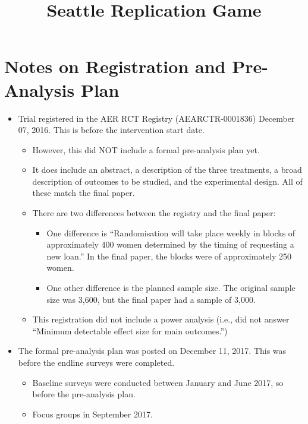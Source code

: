 \documentclass[]{article}
\title{Seattle Replication Game}
\author{}
\begin{document}
\maketitle



\section{Notes on Registration and Pre-Analysis Plan}

\begin{itemize}
	\item Trial registered in the AER RCT Registry (AEARCTR-0001836) December 07, 2016. This is before the intervention start date.
	\begin{itemize}
		\item However, this did NOT include a formal pre-analysis plan yet.
		\item It does include an abstract, a description of the three treatments, a broad description of outcomes to be studied, and the experimental design. All of these match the final paper.
		\item There are two differences between the registry and the final paper: 
		\begin{itemize}
			\item One difference is ``Randomisation will take place weekly in blocks of approximately 400 women determined by the timing of requesting a new loan.'' In the final paper, the blocks were of approximately 250 women.
			\item One other difference is the planned sample size. The original sample size was 3,600, but the final paper had a sample of 3,000.
		\end{itemize}
		\item This registration did not include a power analysis (i.e., did not answer ``Minimum detectable effect size for main outcomes.'')
	\end{itemize}
	\item The formal pre-analysis plan was posted on December 11, 2017. This was before the endline surveys were completed.
	\begin{itemize}
		\item Baseline surveys were conducted between January and June 2017, so before the pre-analysis plan.
		\item Focus groups in September 2017.

\end{itemize}
\end{itemize}
\end{document}
